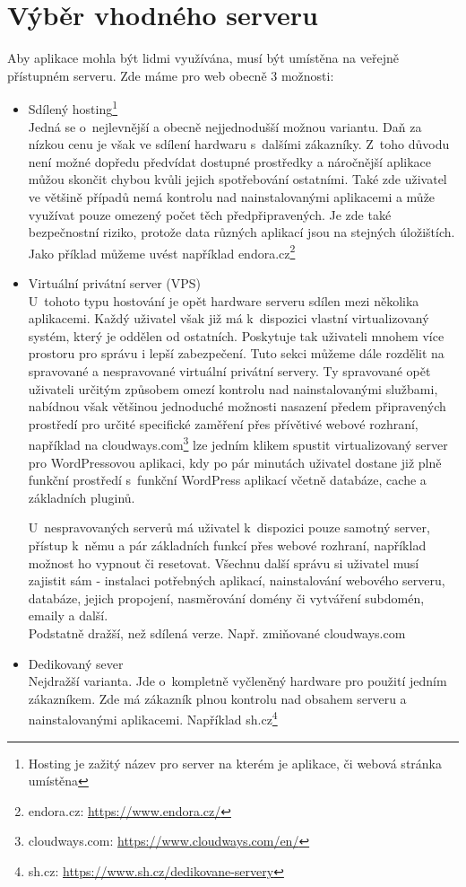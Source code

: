 \section{Výběr vhodného serveru}
Aby aplikace mohla být lidmi využívána, musí být umístěna na veřejně přístupném serveru. Zde máme pro web obecně 3 možnosti:
\begin{itemize}
    \item Sdílený hosting\footnote{Hosting je zažitý název pro server na kterém je aplikace, či webová stránka umístěna}\\
    Jedná se o~nejlevnější a obecně nejjednodušší možnou variantu. Daň za nízkou cenu je však ve sdílení hardwaru s~dalšími zákazníky. Z~toho důvodu není možné dopředu předvídat dostupné prostředky a náročnější aplikace můžou skončit chybou kvůli jejich spotřebování ostatními. Také zde uživatel ve většině případů nemá kontrolu nad nainstalovanými aplikacemi a může využívat pouze omezený počet těch předpřipravených. Je zde také bezpečnostní riziko, protože data různých aplikací jsou na stejných úložištích. Jako příklad můžeme uvést například endora.cz\footnote{endora.cz: \url{https://www.endora.cz/}}
    \item Virtuální privátní server (VPS)\\
    U~tohoto typu hostování je opět hardware serveru sdílen mezi několika aplikacemi. Každý uživatel však již má k~dispozici vlastní virtualizovaný systém, který je oddělen od ostatních. Poskytuje tak uživateli mnohem více prostoru pro správu i lepší zabezpečení.
    Tuto sekci můžeme dále rozdělit na spravované a nespravované virtuální privátní servery. Ty spravované opět uživateli určitým způsobem omezí kontrolu nad nainstalovanými službami, nabídnou však většinou jednoduché možnosti nasazení předem připravených prostředí pro určité specifické zaměření přes přívětivé webové rozhraní, například na cloudways.com\footnote{cloudways.com: \url{https://www.cloudways.com/en/}} lze jedním klikem spustit virtualizovaný server pro WordPressovou aplikaci, kdy po pár minutách uživatel dostane již plně funkční prostředí s~funkční WordPress aplikací včetně databáze, cache a základních pluginů.\par
    U~nespravovaných serverů má uživatel k~dispozici pouze samotný server, přístup k~němu a pár základních funkcí přes webové rozhraní, například možnost ho vypnout či resetovat. Všechnu další správu si uživatel musí zajistit sám - instalaci potřebných aplikací, nainstalování webového serveru, databáze, jejich propojení, nasměrování domény či vytváření subdomén, emaily a další.\\
    Podstatně dražší, než sdílená verze. Např. zmiňované cloudways.com
    \item Dedikovaný sever\\
    Nejdražší varianta. Jde o~kompletně vyčleněný hardware pro použití jedním zákazníkem. Zde má zákazník plnou kontrolu nad obsahem serveru a nainstalovanými aplikacemi. Například sh.cz\footnote{sh.cz: \url{https://www.sh.cz/dedikovane-servery}}
\end{itemize}

